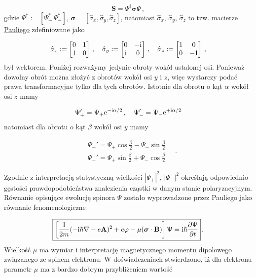 \documentclass{myclass}
\begin{document}
\begin{equation*}
\mathbf{S} = \mathsf{\Psi}^\dagger\boldsymbol{\sigma}\mathsf{\Psi}\,,    
\end{equation*}
gdzie \(\mathsf{\Psi}^\dagger := [\Psi_+^*\,\Psi_-^*]\),
\(\boldsymbol{\sigma}=[\hat{\sigma}_x,\hat{\sigma}_y,\hat{\sigma}_z]\), natomiast
\(\hat{\sigma}_x\), \(\hat{\sigma}_y\), \(\hat{\sigma}_z\) to tzw. \underline{macierze Pauliego}
zdefiniowane jako

\begin{equation*}
\hat{\sigma}_x:=\begin{bmatrix}
0 & 1\\
1 & 0
\end{bmatrix}\,,\quad 
\hat{\sigma}_y:=\begin{bmatrix}
0 & -\mathrm{i}\\
\mathrm{i} & 0
\end{bmatrix}\,,\quad 
\hat{\sigma}_z:=\begin{bmatrix}
1 & 0\\
0 & -1
\end{bmatrix}\,,
\end{equation*}
był wektorem. Poniżej rozważymy jedynie obroty wokół ustalonej osi. Ponieważ dowolny obrót można
złożyć z obrotów wokół osi \(y\) i \(z\), więc wystarczy podać prawa transformacyjne tylko dla tych
obrotów. Istotnie dla obrotu o kąt \(\alpha\) wokół osi \(z\) mamy

\begin{equation*}
    \Psi_+' = \Psi_+\mathrm{e}^{-\mathrm{i}\alpha/2}\,,\quad \Psi_-' = \Psi_-\mathrm{e}^{+\mathrm{i}\alpha/2}
\end{equation*}
natomiast dla obrotu o kąt \(\beta\) wokół osi \(y\) mamy

\begin{equation*}
    \begin{split}
        &\Psi_+' = \Psi_+\cos\frac{\beta}{2} - \Psi_-\sin\frac{\beta}{2}\\
        &\Psi_-' = \Psi_+\sin\frac{\beta}{2} + \Psi_-\cos\frac{\beta}{2}        
    \end{split}\quad.
\end{equation*}

Zgodnie z interpretacją statystyczną wielkości \(|\Psi_+|^2\), \(|\Psi_-|^2\) określają odpowiednio
gęstości prawdopodobieństwa znalezienia cząstki w danym stanie polaryzacyjnym. Równanie opisujące
ewolucję spinora \(\mathsf{\Psi}\) zostało wyprowadzone przez Pauliego jako równanie
fenomenologiczne

\begin{equation*}
\boxed{\left[\frac{1}{2m}(-\mathrm{i}\hbar\nabla-e\mathbf{A})^2+e\varphi-\mu(\boldsymbol{\sigma}\cdot\mathbf{B})\right]\mathsf{\Psi}=\mathrm{i}\hbar\pdv{\mathsf{\Psi}}{t}}\,.
\end{equation*}
Wielkość \(\mu\) ma wymiar i interpretację magnetycznego momentu dipolowego związanego ze spinem
elektronu. W doświadczeniach stwierdzono, iż dla elektronu parametr \(\mu\) ma z bardzo dobrym
przybliżeniem wartość
\end{document}
